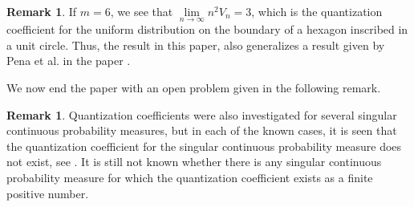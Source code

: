 \documentclass[12pt]{amsart}
\theoremstyle{plain}
\theoremstyle{definition}
\newtheorem{remark}[subsection]{Remark}
\begin{document}
 \begin{remark}
 If $m=6$, we see that $\lim\limits_{n\to \infty} n^2V_n=3$, which is the quantization coefficient for the uniform distribution on the boundary of a hexagon inscribed in a unit circle. Thus, the result in this paper, also generalizes a result given by Pena et al. in the paper \cite{PRRSS}.
 \end{remark}

 We now end the paper with an open problem given in the following remark.

 \begin{remark}
 Quantization coefficients were also investigated for several singular continuous probability measures, but in each of the known cases, it is seen that the quantization coefficient for the singular continuous probability measure does not exist, see \cite{CR1, CR2, CR3, GL2, R3, R6}. It is still not known whether there is any singular continuous probability measure for which the quantization coefficient exists as a finite positive number.
 \end{remark}
\end{document}

